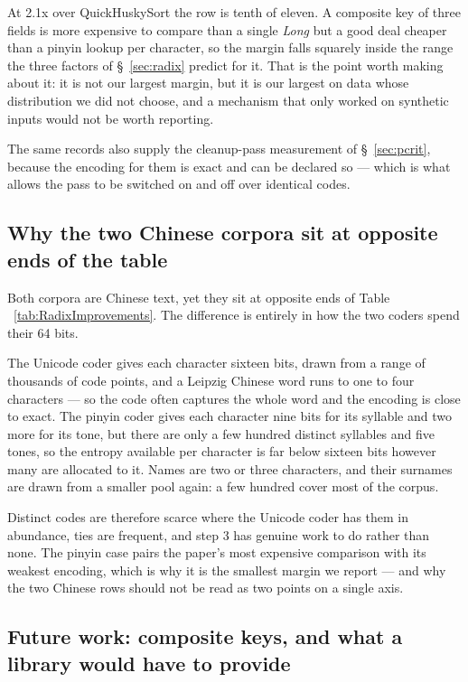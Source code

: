 \documentclass[twoside,leqno,twocolumn]{article}
\begin{document}
At 2.1x over QuickHuskySort the row is tenth of eleven.
A composite key of three fields is more expensive to compare than a single \textit{Long} but a good
deal cheaper than a pinyin lookup per character, so the margin falls squarely inside the range the
three factors of \S~\ref{sec:radix} predict for it.
That is the point worth making about it: it is not our largest margin, but it is our largest on data
whose distribution we did not choose, and a mechanism that only worked on synthetic inputs would not be
worth reporting.

The same records also supply the cleanup-pass measurement of \S~\ref{sec:pcrit},
because the encoding for them is exact and can be declared so ---
which is what allows the pass to be switched on and off over identical codes.

\subsection{Why the two Chinese corpora sit at opposite ends of the table}
\label{sec:chinese-coders}

Both corpora are Chinese text, yet they sit at opposite ends of Table
~\ref{tab:RadixImprovements}.
The difference is entirely in how the two coders spend their 64 bits.

The Unicode coder gives each character sixteen bits, drawn from a range of thousands of code points,
and a Leipzig Chinese word runs to one to four characters --- so the code often captures the whole word
and the encoding is close to exact.
The pinyin coder gives each character nine bits for its syllable and two more for its tone, but there
are only a few hundred distinct syllables and five tones, so the entropy available per character is far
below sixteen bits however many are allocated to it.
Names are two or three characters, and their surnames are drawn from a smaller pool again: a few
hundred cover most of the corpus.

Distinct codes are therefore scarce where the Unicode coder has them in abundance, ties are frequent,
and step 3 has genuine work to do rather than none.
The pinyin case pairs the paper's most expensive comparison with its weakest encoding, which is why it
is the smallest margin we report --- and why the two Chinese rows should not be read as two points on a
single axis.

\subsection{Future work: composite keys, and what a library would have to provide}
\label{sec:composite-future}
\end{document}

